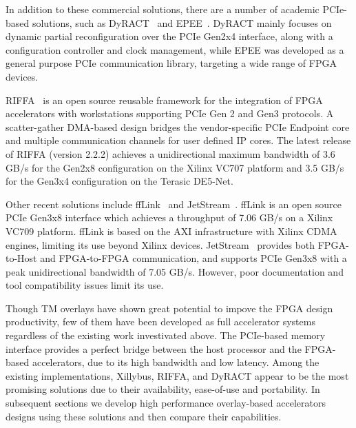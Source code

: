 In addition to these commercial solutions, there are a number of academic PCIe-based solutions, such as DyRACT~\cite{vipin2014dyract} and EPEE~\cite{gong2014efficient}.
DyRACT mainly focuses on dynamic partial reconfiguration over the PCIe Gen2x4 interface, along with a configuration controller and clock management, while EPEE was developed as a general purpose PCIe communication library, targeting a wide range of FPGA devices. 

RIFFA~\cite{jacobsen2015riffa} is an open source reusable framework for the integration of FPGA accelerators with workstations supporting PCIe Gen 2 and Gen3 protocols. 
A scatter-gather DMA-based design bridges the vendor-specific PCIe Endpoint core and multiple communication channels for user defined IP cores. 
The latest release of RIFFA (version 2.2.2) achieves a unidirectional maximum bandwidth of 3.6 GB/s for the Gen2x8 configuration on the Xilinx VC707 platform and 3.5 GB/s for the Gen3x4 configuration on the Terasic DE5-Net.

Other recent solutions include ffLink~\cite{de2016fflink} and JetStream~\cite{vesper2016jetstream}. 
ffLink is an open source PCIe Gen3x8 interface which achieves a throughput of 7.06 GB/s on a Xilinx VC709 platform. 
ffLink is based on the AXI infrastructure with Xilinx CDMA engines, limiting its use beyond Xilinx devices. 
JetStream~\cite{vesper2016jetstream} provides both FPGA-to-Host and FPGA-to-FPGA communication, and supports PCIe Gen3x8  with a peak unidirectional bandwidth of 7.05 GB/s. 
However, poor documentation and tool compatibility issues limit its use.

Though TM overlays have shown great potential to impove the FPGA design productivity, few of them have been developed as full accelerator systems regardless of the existing work investivated above. 
The PCIe-based memory interface provides a perfect bridge between the host processor and the FPGA-based accelerators, due to its high bandwidth and low latency. 
Among the existing implementations, Xillybus, RIFFA, and DyRACT appear to be the most promising solutions due to their availability, ease-of-use and portability. 
In subsequent sections we develop high performance overlay-based accelerators designs using these solutions and then compare their capabilities.


